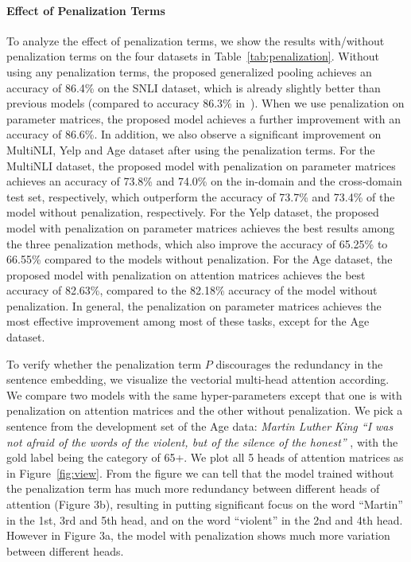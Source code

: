 \documentclass[11pt]{article}
\begin{document}
\paragraph{Effect of Penalization Terms}
To analyze the effect of penalization terms, we show the results with/without penalization terms on the four datasets in Table~\ref{tab:penalization}. Without using any penalization terms, the proposed generalized pooling achieves an accuracy of 86.4\% on the SNLI dataset, which is already slightly better than previous models (compared to accuracy 86.3\% in~). When we use penalization on parameter matrices, the proposed model achieves a further improvement with an accuracy of 86.6\%. In addition, we also observe a significant improvement on MultiNLI, Yelp and Age dataset after using the penalization terms. For the MultiNLI dataset, the proposed model with penalization on parameter matrices achieves an accuracy of 73.8\% and 74.0\% on the in-domain and the cross-domain test set, respectively, which outperform the accuracy of 73.7\% and 73.4\% of the model without penalization, respectively. For the Yelp dataset, the proposed model with penalization on parameter matrices achieves the best results among the three penalization methods, which also improve the accuracy of 65.25\% to 66.55\% compared to the models without penalization. For the Age dataset, the proposed model with penalization on attention matrices achieves the best accuracy of 82.63\%, compared to the 82.18\% accuracy of the model without penalization. In general, the penalization on parameter matrices achieves the most effective improvement among most of these tasks, except for the Age dataset.

To verify whether the penalization term $P$ discourages the redundancy in the sentence embedding, we visualize the vectorial multi-head attention according. We compare two models with the same hyper-parameters except that one is with penalization on attention matrices and the other without penalization. We pick a sentence from the development set of the Age data: \textit{Martin Luther King ``I was not afraid of the words of the violent, but of the silence of the honest'' }, with the gold label being the category of 65+. We plot all 5 heads of attention matrices as in Figure~\ref{fig:view}. From the figure we can tell that the model trained without the penalization term has much more redundancy between different heads of attention (Figure 3b), resulting in putting significant focus on the word ``Martin'' in the 1st, 3rd and 5th head, and on the word ``violent'' in the 2nd and 4th head. However in Figure 3a, the model with penalization shows much more variation between different heads.  
\end{document}

